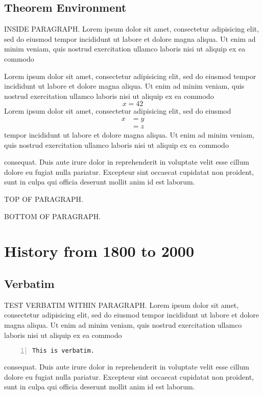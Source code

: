 \section{Theorem Environment}

INSIDE PARAGRAPH.
Lorem ipsum dolor sit amet, consectetur adipisicing elit, sed do eiusmod 
tempor incididunt ut labore et dolore magna aliqua. Ut enim ad minim veniam, 
quis nostrud exercitation ullamco laboris nisi ut aliquip ex ea commodo 
\begin{thm}
Lorem ipsum dolor sit amet, consectetur adipisicing elit, sed do eiusmod 
tempor incididunt ut labore et dolore magna aliqua. Ut enim ad minim veniam, 
quis nostrud exercitation ullamco laboris nisi ut aliquip ex ea commodo 
\[
x = 42
\]
Lorem ipsum dolor sit amet, consectetur adipisicing elit, sed do eiusmod 
\begin{align*}
x &= y \\
  &= z
\end{align*}
tempor incididunt ut labore et dolore magna aliqua. Ut enim ad minim veniam, 
quis nostrud exercitation ullamco laboris nisi ut aliquip ex ea commodo 
\end{thm}
\noindent 
consequat. Duis aute irure dolor in reprehenderit in voluptate velit esse 
cillum dolore eu fugiat nulla pariatur. Excepteur sint occaecat cupidatat non 
proident, sunt in culpa qui officia deserunt mollit anim id est laborum.

TOP OF PARAGRAPH.
\begin{thm}
\lipsum[10]
\end{thm}
\noindent
\lipsum[1]

BOTTOM OF PARAGRAPH.
\lipsum[1]
\begin{thm}
\lipsum[10]
\end{thm}


\chapter{History from 1800 to 2000}

\section{Verbatim}
TEST VERBATIM WITHIN PARAGRAPH.
Lorem ipsum dolor sit amet, consectetur adipisicing elit, sed do eiusmod 
tempor incididunt ut labore et dolore magna aliqua. Ut enim ad minim veniam, 
quis nostrud exercitation ullamco laboris nisi ut aliquip ex ea commodo 
\begin{Verbatim}[frame=single, numbers=left]
This is verbatim.
\end{Verbatim}
consequat. Duis aute irure dolor in reprehenderit in voluptate velit esse 
cillum dolore eu fugiat nulla pariatur. Excepteur sint occaecat cupidatat non 
proident, sunt in culpa qui officia deserunt mollit anim id est laborum.

